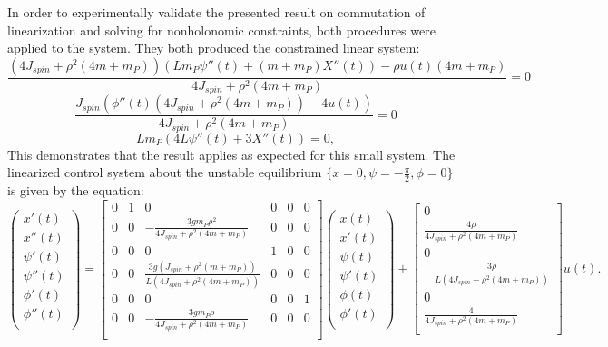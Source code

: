 In order to experimentally validate the presented result on commutation of linearization and solving for nonholonomic constraints, both procedures were applied to the system. 
They both produced the constrained linear system:
\begin{equation}
	\frac{\left(4 J_{spin}+\rho ^2 (4 m+m_{P})\right)
   \left(L m_{P} \psi ''(t)+(m+m_{P}) X''(t)\right)-\rho 
   u(t) (4 m+m_{P})}{4 J_{spin}+\rho ^2 (4
   m+m_{P})}=0
\end{equation}
\begin{equation}
	\frac{J_{spin} \left(\phi ''(t) \left(4
   J_{spin}+\rho ^2 (4 m+m_{P})\right)-4 u(t)\right)}{4
   J_{spin}+\rho ^2 (4 m+m_{P})}=0
\end{equation}
\begin{equation}
	L m_{P} \left(4 L
   \psi ''(t)+3 X''(t)\right)=0,
\end{equation}
This demonstrates that the result applies as expected for this small system. 
The linearized control system about the unstable equilibrium $\{x=0,\psi=-\frac{\pi}{2},\phi=0\}$ is given by the equation:
\begin{equation}
\left(
\begin{array}{c}
 x'(t) \\
 x''(t) \\
 \psi'(t) \\
 \psi''(t) \\
 \phi'(t) \\
 \phi''(t) \\
\end{array}
\right)
=
\left[
\begin{array}{cccccc}
 0 & 1 & 0 & 0 & 0 & 0 \\
 0 & 0 & -\frac{3 g m_{P} \rho ^2}{4 J_{spin}+\rho ^2 (4
   m+m_{P})} & 0 & 0 & 0 \\
 0 & 0 & 0 & 1 & 0 & 0 \\
 0 & 0 & \frac{3 g \left(J_{spin}+\rho ^2
   (m+m_{P})\right)}{L \left(4 J_{spin}+\rho ^2 (4
   m+m_{P})\right)} & 0 & 0 & 0 \\
 0 & 0 & 0 & 0 & 0 & 1 \\
 0 & 0 & -\frac{3 g m_{P} \rho }{4 J_{spin}+\rho ^2 (4
   m+m_{P})} & 0 & 0 & 0 \\
\end{array}
\right]
\left(
\begin{array}{c}
 x(t) \\
 x'(t) \\
 \psi(t) \\
 \psi'(t) \\
 \phi(t) \\
 \phi'(t) \\
\end{array}
\right)
+
\left[
\begin{array}{c}
 0 \\
 \frac{4 \rho }{4 J_{spin}+\rho ^2 (4 m+m_{P})} \\
 0 \\
 -\frac{3 \rho }{L \left(4 J_{spin}+\rho ^2 (4
   m+m_{P})\right)} \\
 0 \\
 \frac{4}{4 J_{spin}+\rho ^2 (4 m+m_{P})} \\
\end{array}
\right]u(t).
\end{equation}
